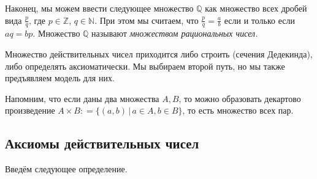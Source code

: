 Наконец, мы можем ввести следующее множество $\mathbb{Q}$ как множество всех дробей вида $\frac{p}{q}$, где $p\in\mathbb{Z}$, $q \in \mathbb{N}$. При этом мы считаем, что $\frac{p}{q} = \frac{a}{b}$ если и только если $aq = bp$. Множество $\mathbb{Q}$ называют \textit{множеством рациональных чисел.}

Множество действительных чисел приходится либо строить (сечения Дедекинда), либо определять аксиоматически. Мы выбираем второй путь, но мы также предъявляем модель для них.

Напомним, что если даны два множества $A, B$, то можно образовать декартово произведение $A\times B: = \{(a,b)\,|\, a\in A, b\in B\}$, то есть множество всех пар.

\subsection{Аксиомы действительных чисел}

Введём следующее определение.

